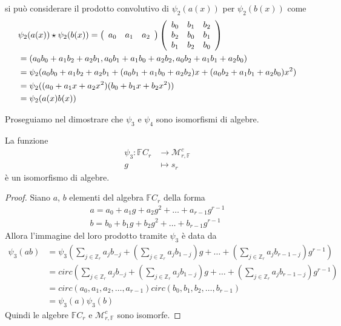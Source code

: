 si può considerare il prodotto convolutivo di $\psi_{2}(a(x))$
per $\psi_{2}(b(x))$ come
\begin{align*}
&\psi_{2}(a(x)) \star \psi_{2}(b(x))
=
\left(
\begin{array} {c c c }
a_0 & a_1 & a_2
\end{array}
\right)
\left(
\begin{array} {c c c}
b_0 & b_1 & b_2   \\
b_2 & b_0 & b_1   \\
b_1 & b_2 & b_0
\end{array}
\right)
\\
&=
(
a_{0}b_{0} + a_{1}b_{2} + a_{2}b_{1},
a_{0}b_{1} + a_{1}b_{0} + a_{2}b_{2},
a_{0}b_{2} + a_{1}b_{1} + a_{2}b_{0}
)
\\
&=
\psi_{2}
(
a_{0}b_{0} + a_{1}b_{2} + a_{2}b_{1} +
(a_{0}b_{1} + a_{1}b_{0} + a_{2}b_{2})x +
(a_{0}b_{2} + a_{1}b_{1} + a_{2}b_{0})x^2
)
\\
&=
\psi_{2}((a_{0} + a_{1}x+ a_{2}x^2)(b_{0} + b_{1}x+ b_{2}x^2))
\\
&=
\psi_{2}(a(x)b(x))
\end{align*}


Proseguiamo nel dimostrare che $\psi_{3}$ e $\psi_{4}$ sono isomorfismi di
algebre.

\begin{prop}
La funzione
\begin{align*}
\psi_{3}: \mathbb{F}C_{r}
          &\longrightarrow
          \mathcal{M}_{r,\mathbb{F} }^{c}  \\
              g
              &\longmapsto
              s_{r}
\end{align*}
è un isomorfismo di algebre.
\end{prop}

\begin{proof}
Siano $a$, $b$ elementi del algebra $\mathbb{F}C_{r}$ della forma
\begin{align*}
 a = a_0 + a_1 g + a_2 g^2 + \dots + a_{r-1} g^{r-1}
\\
 b = b_0 + b_1 g + b_2 g^2 + \dots + b_{r-1} g^{r-1}
\end{align*}
Allora l'immagine del loro prodotto tramite $\psi_{3}$ è data da
\begin{align*}
\psi_{3}(ab)
&= \psi_{3}(
\sum_{j \in \mathbb{Z}_{r} } a_{j} b_{-j} +
(\sum_{j \in \mathbb{Z}_{r} } a_{j} b_{1-j})g +
\dots +
(\sum_{j \in \mathbb{Z}_{r} } a_{j} b_{r-1-j})g^{r-1} )
\\
&= circ
(
\sum_{j \in \mathbb{Z}_{r} } a_{j} b_{-j} +
(\sum_{j \in \mathbb{Z}_{r} } a_{j} b_{1-j})g +
\dots +
(\sum_{j \in \mathbb{Z}_{r} } a_{j} b_{r-1-j})g^{r-1}
)
\\
&=
circ(a_0, a_1, a_2, \dots , a_{r-1})
circ( b_0, b_1, b_2 , \dots , b_{r-1} )
\\
&= \psi_{3}(a) \psi_{3}(b)
\end{align*}
Quindi le algebre $\mathbb{F}C_{r}$ e
$\mathcal{M}_{r,\mathbb{F} }^{c}$ sono
isomorfe.
\end{proof}

